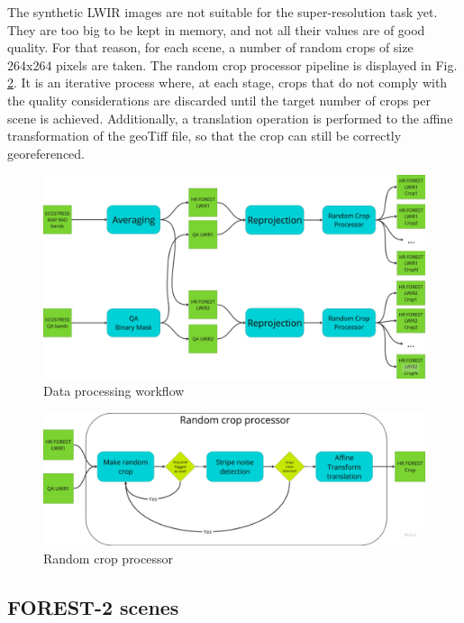 The synthetic LWIR images are not suitable for the super-resolution task yet.
They are too big to be kept in memory, and not all their values are of good quality.
For that reason, for each scene, a number of random crops of size 264x264 pixels are taken.
The random crop processor pipeline is displayed in Fig. \ref{fig:5-random_crop_processor}.
It is an iterative process where, at each stage, crops that do not comply with the quality considerations are discarded until the target number of crops per scene is achieved. Additionally, a translation operation is performed to the affine transformation of the geoTiff file, so that the crop can still be correctly georeferenced.


\begin{figure}[H]
    \centering
    \includegraphics[width=\linewidth]{Includes/5-data_processing_flow_chart.pdf}
    \caption{Data processing workflow}
    \label{fig:5-data_processing_flow_chart}
\end{figure}

\begin{figure}[H]
    \centering
    \includegraphics[width=\linewidth]{Includes/5-random_crop_processor.pdf}
    \caption{Random crop processor}
    \label{fig:5-random_crop_processor}
\end{figure}



\subsection{FOREST-2 scenes}

